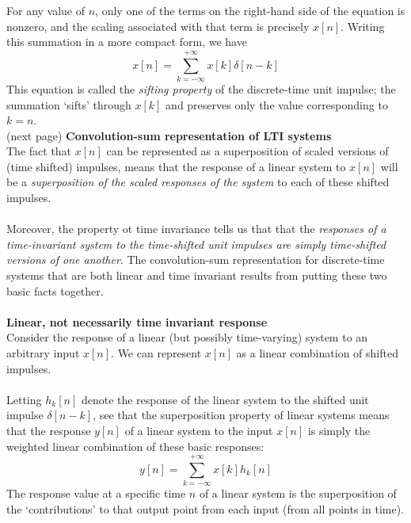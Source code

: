 \documentclass{report}
\begin{document}
For any value of $n$, only one of the terms on the right-hand side of the equation is nonzero, and the scaling associated
with that term is precisely $x[n]$. Writing this summation in a more compact form, we have
\begin{equation*}
x[n]=\sum^{+\infty}_{k=-\infty}x[k]\delta[n-k]
\end{equation*}
This equation is called the \textit{sifting property} of the discrete-time unit impulse; the summation `sifts' through
$x[k]$ and preserves only the value corresponding to $k=n$.\\
(next page)\newpage
\noindent\textbf{Convolution-sum representation of LTI systems}\\
The fact that $x[n]$ can be represented as a superposition of scaled versions of (time shifted) impulses, means that the response
of a linear system to $x[n]$ will be a \textit{superposition of the scaled responses of the system} to each of these shifted 
impulses.\\
\vspace{1mm}\\
Moreover, the property ot time invariance tells us that that the \textit{responses of a time-invariant system to the 
time-shifted unit 
impulses are simply time-shifted versions of one another}. The convolution-sum representation for discrete-time systems that 
are both linear and time invariant results from putting these two basic facts together.\\
\vspace{1mm}\\
\textbf{Linear, not necessarily time invariant response}\\
Consider the response of a linear (but possibly time-varying) system to an arbitrary input $x[n]$. We can represent
$x[n]$ as a linear combination of shifted impulses.\\
\vspace{1mm}\\
Letting $h_k[n]$ denote the response of the linear system to the shifted unit
impulse $\delta[n-k]$, see that the superposition property of linear systems means that the response $y[n]$ 
of a linear system to the input $x[n]$ is simply the weighted
linear combination of these basic responses:
\begin{equation*}
y[n]=\sum^{+\infty}_{k=-\infty}x[k]h_k[n]
\end{equation*}
The response value at a specific time $n$ of a linear system is the superposition of the `contributions' to that output point from each input (from all points in time).\\
\end{document}
